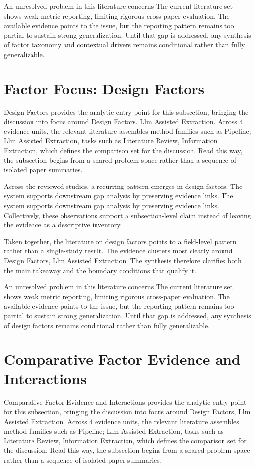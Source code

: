 \documentclass{article}
\begin{document}
An unresolved problem in this literature concerns The current literature set shows weak metric reporting, limiting rigorous cross-paper evaluation. The available evidence points to the issue, but the reporting pattern remains too partial to sustain strong generalization. Until that gap is addressed, any synthesis of factor taxonomy and contextual drivers remains conditional rather than fully generalizable. \cite{08_2016_zhou_aap,17_2017_chen_aap}

\section{Factor Focus: Design Factors}
Design Factors provides the analytic entry point for this subsection, bringing the discussion into focus around Design Factors, Llm Assisted Extraction. Across 4 evidence units, the relevant literature assembles method families such as Pipeline; Llm Assisted Extraction, tasks such as Literature Review, Information Extraction, which defines the comparison set for the discussion. Read this way, the subsection begins from a shared problem space rather than a sequence of isolated paper summaries. \cite{08_2016_zhou_aap,17_2017_chen_aap}

Across the reviewed studies, a recurring pattern emerges in design factors. The system supports downstream gap analysis by preserving evidence links. The system supports downstream gap analysis by preserving evidence links. Collectively, these observations support a subsection-level claim instead of leaving the evidence as a descriptive inventory. \cite{08_2016_zhou_aap,17_2017_chen_aap,09_2018_jiang_aap}

Taken together, the literature on design factors points to a field-level pattern rather than a single-study result. The evidence clusters most clearly around Design Factors, Llm Assisted Extraction. The synthesis therefore clarifies both the main takeaway and the boundary conditions that qualify it. \cite{08_2016_zhou_aap,17_2017_chen_aap}

An unresolved problem in this literature concerns The current literature set shows weak metric reporting, limiting rigorous cross-paper evaluation. The available evidence points to the issue, but the reporting pattern remains too partial to sustain strong generalization. Until that gap is addressed, any synthesis of design factors remains conditional rather than fully generalizable. \cite{08_2016_zhou_aap,17_2017_chen_aap}

\section{Comparative Factor Evidence and Interactions}
Comparative Factor Evidence and Interactions provides the analytic entry point for this subsection, bringing the discussion into focus around Design Factors, Llm Assisted Extraction. Across 4 evidence units, the relevant literature assembles method families such as Pipeline; Llm Assisted Extraction, tasks such as Literature Review, Information Extraction, which defines the comparison set for the discussion. Read this way, the subsection begins from a shared problem space rather than a sequence of isolated paper summaries. \cite{08_2016_zhou_aap,17_2017_chen_aap}
\end{document}
